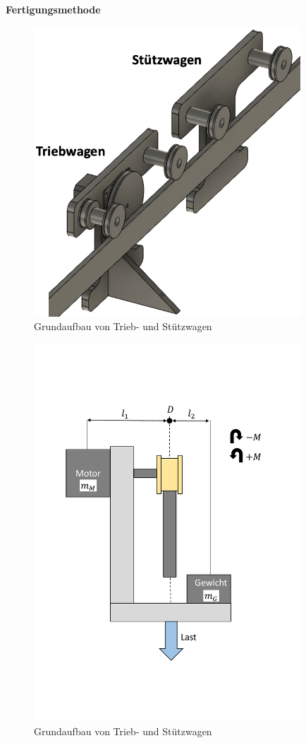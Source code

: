 \textbf{Fertigungsmethode} 

\begin{figure}[h]
	\centering
	\includegraphics[width=10cm]{grundaufbau.png} 
	\caption{Grundaufbau von Trieb- und Stützwagen}
	\label{pic:grundaufbau}
\end{figure}

\begin{figure}[h]
	\centering
	\includegraphics[width=10cm]{kippmoment.pdf} 
	\caption{Grundaufbau von Trieb- und Stützwagen}
	\label{pic:kippmoment}
\end{figure}




